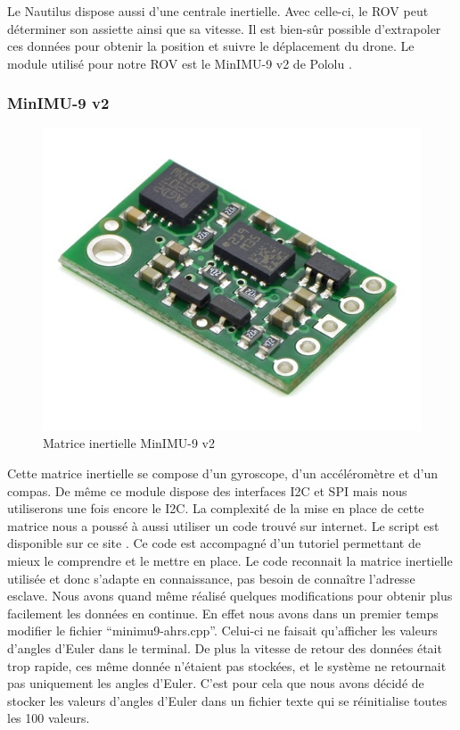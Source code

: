 \documentclass[a4paper,11pt]{report}
\begin{document}
		Le Nautilus dispose aussi d'une centrale inertielle. Avec celle-ci, le ROV peut déterminer son assiette ainsi que sa vitesse. Il est bien-sûr possible d'extrapoler ces données pour obtenir la position et suivre le déplacement du drone. Le module utilisé pour notre ROV est le MinIMU-9 v2 de Pololu \cite{ref13}.
		
			\subsubsection{MinIMU-9 v2}
			\begin{figure}[!h]
					\begin{center}
						\includegraphics[scale=0.5]{Photos/Capture31.jpg}
						\caption{Matrice inertielle MinIMU-9 v2}
					\end{center}
				\end{figure}
				Cette matrice inertielle se compose d'un gyroscope, d'un accéléromètre et d'un compas. De même ce module dispose des interfaces I2C et SPI mais nous utiliserons une fois encore le I2C. La complexité de la mise en place de cette matrice nous a poussé à aussi utiliser un code trouvé sur internet. Le script est disponible sur ce site \cite{ref14}. Ce code est accompagné d'un tutoriel permettant de mieux le comprendre et le mettre en place. Le code reconnait la matrice inertielle utilisée et donc s'adapte en connaissance, pas besoin de connaître l'adresse esclave. Nous avons quand même réalisé quelques modifications pour obtenir plus facilement les données en continue. En effet nous avons dans un premier temps modifier le fichier "`minimu9-ahrs.cpp"'. Celui-ci ne faisait qu'afficher les valeurs d'angles d’Euler dans le terminal. De plus la vitesse de retour des données était trop rapide, ces même donnée n'étaient pas stockées, et le système ne retournait pas uniquement les angles d’Euler. C'est pour cela que nous avons décidé de stocker les valeurs d'angles d’Euler dans un fichier texte qui se réinitialise toutes les 100 valeurs.
\end{document}

